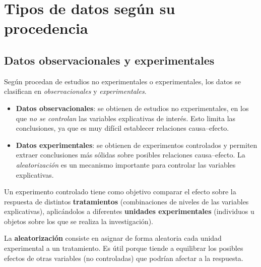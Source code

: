 \section{Tipos de datos según su procedencia}
\label{sec:t1-datos}

\subsection{Datos observacionales y experimentales}

Según procedan de estudios no experimentales o experimentales, los datos se clasifican en
\emph{observacionales} y \emph{experimentales}.

\begin{definicion}
  \begin{itemize}
    \item \textbf{Datos observacionales}: se obtienen de estudios no experimentales, en los
      que \emph{no se controlan} las variables explicativas de interés. Esto limita las
      conclusiones, ya que es muy difícil establecer relaciones causa--efecto.
    \item \textbf{Datos experimentales}: se obtienen de experimentos controlados y permiten
      extraer conclusiones más sólidas sobre posibles relaciones causa--efecto. La
      \emph{aleatorización} es un mecanismo importante para controlar las variables
      explicativas.
  \end{itemize}
\end{definicion}

Un experimento controlado tiene como objetivo comparar el efecto sobre la respuesta de
distintos \textbf{tratamientos} (combinaciones de niveles de las variables explicativas),
aplicándolos a diferentes \textbf{unidades experimentales} (individuos u objetos sobre los que
se realiza la investigación).

\begin{definicion}[Aleatorización]
  La \textbf{aleatorización} consiste en asignar de forma aleatoria cada unidad
  experimental a un tratamiento. Es útil porque tiende a equilibrar los posibles efectos de
  otras variables (no controladas) que podrían afectar a la respuesta.
\end{definicion}

